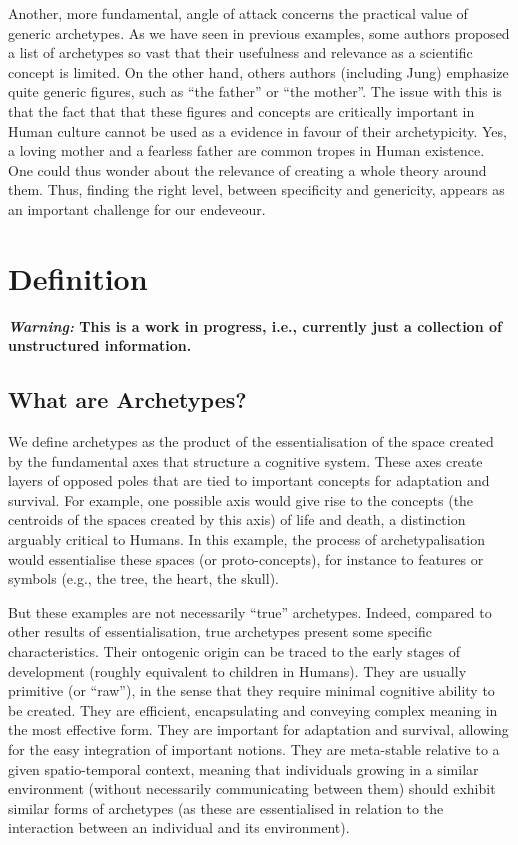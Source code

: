 \documentclass[]{book}
\begin{document}
Another, more fundamental, angle of attack concerns the practical value of generic archetypes. As we have seen in previous examples, some authors proposed a list of archetypes so vast that their usefulness and relevance as a scientific concept is limited. On the other hand, others authors (including Jung) emphasize quite generic figures, such as ``the father'' or ``the mother''. The issue with this is that the fact that that these figures and concepts are critically important in Human culture cannot be used as a evidence in favour of their archetypicity. Yes, a loving mother and a fearless father are common tropes in Human existence. One could thus wonder about the relevance of creating a whole theory around them. Thus, finding the right level, between specificity and genericity, appears as an important challenge for our endeveour.

\hypertarget{definition}{%
\chapter{Definition}\label{definition}}

\textbf{\emph{Warning:} This is a work in progress, i.e., currently just a collection of unstructured information.}

\hypertarget{what-are-archetypes}{%
\section{What are Archetypes?}\label{what-are-archetypes}}

We define archetypes as the product of the essentialisation of the space created by the fundamental axes that structure a cognitive system. These axes create layers of opposed poles that are tied to important concepts for adaptation and survival. For example, one possible axis would give rise to the concepts (the centroids of the spaces created by this axis) of life and death, a distinction arguably critical to Humans. In this example, the process of archetypalisation would essentialise these spaces (or proto-concepts), for instance to features or symbols (e.g., the tree, the heart, the skull).

But these examples are not necessarily ``true'' archetypes. Indeed, compared to other results of essentialisation, true archetypes present some specific characteristics. Their ontogenic origin can be traced to the early stages of development (roughly equivalent to children in Humans). They are usually primitive (or ``raw''), in the sense that they require minimal cognitive ability to be created. They are efficient, encapsulating and conveying complex meaning in the most effective form. They are important for adaptation and survival, allowing for the easy integration of important notions. They are meta-stable relative to a given spatio-temporal context, meaning that individuals growing in a similar environment (without necessarily communicating between them) should exhibit similar forms of archetypes (as these are essentialised in relation to the interaction between an individual and its environment).
\end{document}
